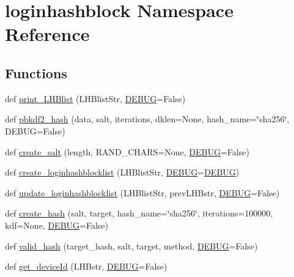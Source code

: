 \hypertarget{namespaceloginhashblock}{}\section{loginhashblock Namespace Reference}
\label{namespaceloginhashblock}
\subsection*{Functions}
\begin{DoxyCompactItemize}
\item 
def \hyperlink{namespaceloginhashblock_a1096aa8494b9c5875decc029d8b40ea9}{print\+\_\+\+L\+H\+Blist} (L\+H\+Blist\+Str, \hyperlink{namespaceloginhashblock_ad198a2ffc3d7bab32167aed00d2f5c65}{D\+E\+B\+UG}=False)
\item 
def \hyperlink{namespaceloginhashblock_a104d0a92cdfb6c337794b6ded42667d4}{pbkdf2\+\_\+hash} (data, salt, iterations, dklen=None, hash\+\_\+name=\char`\"{}sha256\char`\"{}, D\+E\+B\+UG=False)
\item 
def \hyperlink{namespaceloginhashblock_afe116dea3aaff238a5fa2bcd6edf2281}{create\+\_\+salt} (length, R\+A\+N\+D\+\_\+\+C\+H\+A\+RS=None, \hyperlink{namespaceloginhashblock_ad198a2ffc3d7bab32167aed00d2f5c65}{D\+E\+B\+UG}=False)
\item 
def \hyperlink{namespaceloginhashblock_a550707107141dfb228ca4294d7ea31b4}{create\+\_\+loginhashblocklist} (L\+H\+Blist\+Str, \hyperlink{namespaceloginhashblock_ad198a2ffc3d7bab32167aed00d2f5c65}{D\+E\+B\+UG}=\hyperlink{namespaceloginhashblock_ad198a2ffc3d7bab32167aed00d2f5c65}{D\+E\+B\+UG})
\item 
def \hyperlink{namespaceloginhashblock_a2bcc7ddd0fcc3788572dd77808cb624d}{update\+\_\+loginhashblocklist} (L\+H\+Blist\+Str, prev\+L\+H\+Bstr, \hyperlink{namespaceloginhashblock_ad198a2ffc3d7bab32167aed00d2f5c65}{D\+E\+B\+UG}=False)
\item 
def \hyperlink{namespaceloginhashblock_a935d8ae1c51e50f9e5db6a1d5f02b1b8}{create\+\_\+hash} (salt, target, hash\+\_\+name=\char`\"{}sha256\char`\"{}, iterations=100000, kdf=None, \hyperlink{namespaceloginhashblock_ad198a2ffc3d7bab32167aed00d2f5c65}{D\+E\+B\+UG}=False)
\item 
def \hyperlink{namespaceloginhashblock_ac7faa165bc305e611390727f11946424}{valid\+\_\+hash} (target\+\_\+hash, salt, target, method, \hyperlink{namespaceloginhashblock_ad198a2ffc3d7bab32167aed00d2f5c65}{D\+E\+B\+UG}=False)
\item 
def \hyperlink{namespaceloginhashblock_a17417f2f6bca76ab51170082a562e5f6}{get\+\_\+device\+Id} (L\+H\+Bstr, \hyperlink{namespaceloginhashblock_ad198a2ffc3d7bab32167aed00d2f5c65}{D\+E\+B\+UG}=False)

\end{DoxyCompactItemize}
